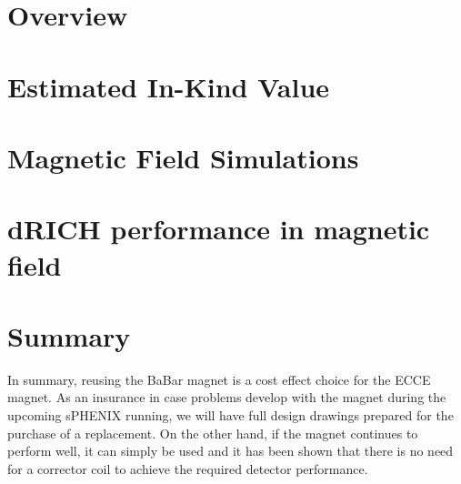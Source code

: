 \documentclass[12pt,twoside]{article}
\begin{document}
\linenumbers
\pagestyle{empty}



\pagestyle{plain}




\tableofcontents
\clearpage


\renewcommand{\thepage}{\arabic{page}}



\section {Overview}
\label{overview}
 
%

\section {Estimated In-Kind Value}
\label{costing}


\section {Magnetic Field Simulations}
\label{simulations}


\section {dRICH performance in magnetic field}
\label{dRICH}


\listoftodos[To Do]

\section{Summary}
\label{summary}
In summary, reusing the BaBar magnet is a cost effect choice for the ECCE magnet.   As an insurance in case problems develop with the magnet during the upcoming sPHENIX running, we will have full design drawings prepared for the purchase of a replacement.   On the other hand, if the magnet continues to perform well, it can simply be used and it has been shown that there is no need for a corrector coil to achieve the required detector performance.  




\end{document}
